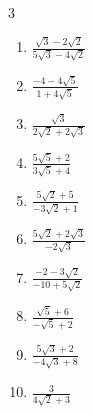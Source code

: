 \begin{multicols}{3}
\begin{enumerate}

  \item $\displaystyle \frac{\sqrt{3}-2\sqrt{2}}{5\sqrt{3}-4\sqrt{2}}$


  \item $\displaystyle \frac{-4-4\sqrt{5}}{1+4\sqrt{5}}$


\columnbreak %

  \item $\displaystyle \frac{\sqrt{3}}{2\sqrt{2}+2\sqrt{3}}$


  \item $\displaystyle \frac{5\sqrt{5}+2}{3\sqrt{5}+4}$


  \item $\displaystyle \frac{5\sqrt{2}+5}{-3\sqrt{2}+1}$


  \item $\displaystyle \frac{5\sqrt{2}+2\sqrt{3}}{-2\sqrt{3}}$


  \item $\displaystyle \frac{-2-3\sqrt{2}}{-10+5\sqrt{2}}$


\columnbreak %

\resetques

  \item $\displaystyle \frac{\sqrt{5}+6}{-\sqrt{5}+2}$


  \item $\displaystyle \frac{5\sqrt{3}+2}{-4\sqrt{3}+8}$


  \item $\displaystyle \frac{3}{4\sqrt{2}+3}$



\end{enumerate}
\end{multicols}
